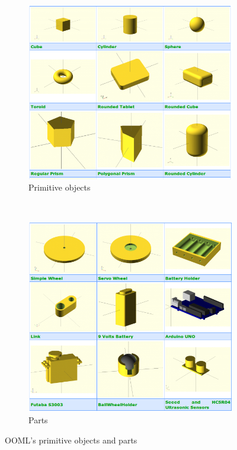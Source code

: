 \begin{figure}[h]
		\centering
        \begin{subfigure}[b]{0.49\textwidth}
                \centering
                \includegraphics[width=\textwidth]{images/Hardware_ooml_primitives.png}
                \caption{Primitive objects}
                \label{fig:hardware_ooml_primitives}
        \end{subfigure}
        ~
        \begin{subfigure}[b]{0.45\textwidth}
                \centering
                \includegraphics[width=\textwidth]{images/Hardware_ooml_parts.png}
                \caption{Parts}
                \label{fig:hardware_ooml_parts}
        \end{subfigure}
        \caption{OOML's primitive objects and parts}
        \label{fig:hardware_ooml_example}
\end{figure}

